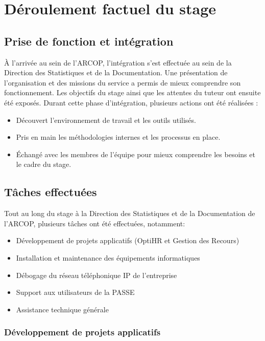 \chapter{Déroulement factuel du stage}
\clearpage

\section{Prise de fonction et intégration}
À l'arrivée au sein de l'\ac{ARCOP}, l'intégration s'est effectuée au sein de la Direction des Statistiques et de la Documentation. Une présentation de l'organisation et des missions du service a permis de mieux comprendre son fonctionnement. Les objectifs du stage ainsi que les attentes du tuteur ont ensuite été exposés.
Durant cette phase d'intégration, plusieurs actions ont été réalisées :

\begin{itemize}
    \item Découvert l'environnement de travail et les outils utilisés.
    \item Pris en main les méthodologies internes et les processus en place.
    \item Échangé avec les membres de l'équipe pour mieux comprendre les besoins et le cadre du stage.
\end{itemize}

\section{Tâches effectuées}
Tout au long du stage à la Direction des Statistiques et de la Documentation de l'\ac{ARCOP}, plusieurs tâches ont été effectuées, notamment:
\begin{itemize}
    \item Développement de projets applicatifs (OptiHR et Gestion des Recours)
    \item Installation et maintenance des équipements informatiques
    \item Débogage du réseau téléphonique IP de l'entreprise 
    \item Support aux utilisateurs de la \ac{PASSE}
    \item Assistance technique générale    
\end{itemize} 

\subsection{Développement de projets applicatifs}

